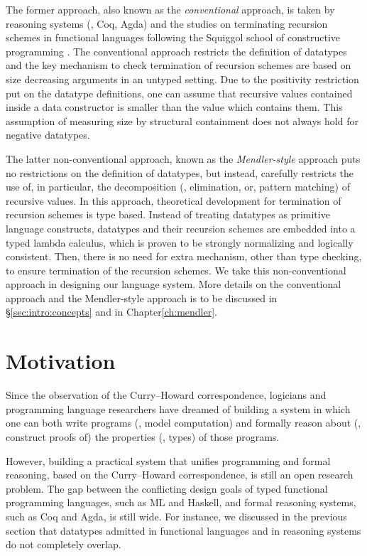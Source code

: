 The former approach, also known as the \emph{conventional} approach,
is taken by reasoning systems (\eg, Coq, Agda) and the studies on
terminating recursion schemes in functional languages following
the Squiggol school of constructive programming \cite{AoP,hagino87phd,Bir87}.
The conventional approach restricts the definition of datatypes and
the key mechanism to check termination of recursion schemes are based on
size decreasing arguments in an untyped setting. Due to the positivity
restriction put on the datatype definitions, one can assume that
recursive values contained inside a data constructor is smaller than
the value which contains them. This assumption of measuring size by
structural containment does not always hold for negative datatypes.

The latter non-conventional approach, known as the \emph{Mendler-style} approach
puts no restrictions on the definition of datatypes, but instead, carefully
restricts the use of, in particular, the decomposition (\ie, elimination, or,
pattern matching) of recursive values. In this approach, theoretical
development for termination of recursion schemes is type based.
Instead of treating datatypes as primitive language constructs, datatypes
and their recursion schemes are embedded into a typed lambda calculus,
which is proven to be strongly normalizing and logically consistent.
Then, there is no need for extra mechanism, other than type checking,
to ensure termination of the recursion schemes. We take this non-conventional
approach in designing our language system. More details on the conventional
approach and the Mendler-style approach is to be discussed
in \S\ref{sec:intro:concepts} and in Chapter\;\ref{ch:mendler}.

\section{Motivation}\label{sec:intro:motiv}
Since the observation of the Curry--Howard correspondence, logicians and
programming language researchers have dreamed of building a system in which
one can both write programs (\ie, model computation) and formally reason about
(\ie, construct proofs of) the properties (\ie, types) of those programs.

However, building a practical system that unifies programming and
formal reasoning, based on the Curry--Howard correspondence, is still
an open research problem. The gap between the conflicting design goals of
typed functional programming languages, such as ML and Haskell,
and formal reasoning systems, such as Coq and Agda, is still wide.
For instance, we discussed in the previous section that datatypes admitted
in functional languages and in reasoning systems do not completely overlap.

